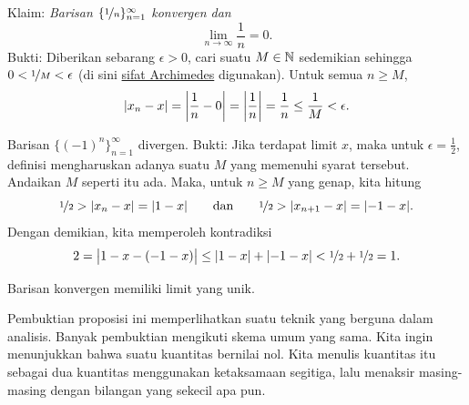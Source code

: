 \begin{example}
Klaim: \emph{Barisan $\{ \nicefrac{1}{n} \}_{n=1}^\infty$ konvergen dan}
\begin{equation*}
\lim_{n\to \infty} \frac{1}{n} = 0 .
\end{equation*}
Bukti: Diberikan sebarang $\epsilon > 0$, cari suatu $M \in {\mathbb{N}}$ sedemikian sehingga
$0 < \nicefrac{1}{M} < \epsilon$
(di sini \hyperref[thm:arch:i]{sifat Archimedes} digunakan).
Untuk semua $n \geq M$,
\begin{equation*}
\lvert {x_n - x} \rvert
=
\left\lvert {\frac{1}{n} - 0} \right\rvert = \left\lvert {\frac{1}{n}} \right\rvert = \frac{1}{n} \leq \frac{1}{M} < \epsilon .
\end{equation*}
\end{example}

\begin{example}
Barisan $\bigl\{ {(-1)}^n \bigr\}_{n=1}^\infty$ divergen.  Bukti: Jika terdapat
limit $x$, maka untuk $\epsilon = \frac{1}{2}$, definisi mengharuskan adanya suatu $M$ yang
memenuhi syarat tersebut.  Andaikan
$M$ seperti itu ada.
Maka, untuk $n \geq M$ yang genap, kita hitung
\begin{equation*}
\nicefrac{1}{2} > \lvert {x_n - x} \rvert  = \lvert {1 - x} \rvert
\qquad \text{dan} \qquad
\nicefrac{1}{2} > \lvert {x_{n+1} - x} \rvert  = \lvert {-1 - x} \rvert .
\end{equation*}
Dengan demikian, kita memperoleh kontradiksi
\begin{equation*}
2 = \bigl\lvert {1 - x - (-1 -x)} \bigr\rvert \leq
\lvert {1 - x} \rvert + \lvert {-1 -x} \rvert < \nicefrac{1}{2} + \nicefrac{1}{2} = 1 .
\end{equation*}
\end{example}

\begin{prop} \label{prop:limisunique}
Barisan konvergen memiliki limit yang unik.
\end{prop}

Pembuktian proposisi ini memperlihatkan suatu teknik yang berguna dalam
analisis.  Banyak pembuktian mengikuti skema umum yang sama.  Kita ingin
menunjukkan bahwa suatu kuantitas bernilai nol.  Kita menulis kuantitas itu sebagai
dua kuantitas menggunakan ketaksamaan segitiga, lalu menaksir masing-masing
dengan bilangan yang sekecil apa pun.

